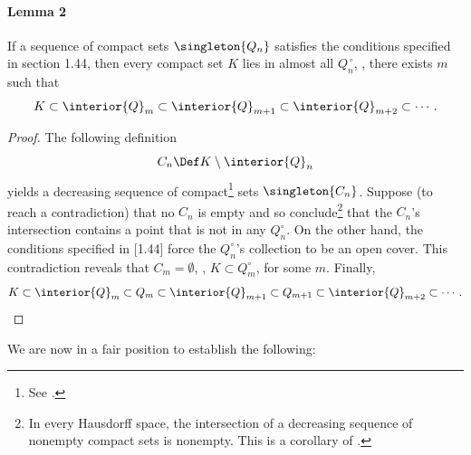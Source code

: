 \paragraph{Lemma 2}\label{1.16 Lemma 2}
If a sequence of compact sets $\singleton{Q_n}$ satisfies the conditions 
specified in section 1.44, then every compact set $K$ lies in almost all 
%
  $Q^{\,\circ}_n$, \ie, 
%
there exists $m$ such that 
%
  \begin{equation}
    K \subset 
    \interior{Q}_m 
      \subset 
    \interior{Q}_{m+1}
      \subset
    \interior{Q}_{m+2}
      \subset
    \cdots.
  \end{equation}
% 
\begin{proof}
The following definition
%
  \begin{equation}
    C_n \Def K \setminus \interior{Q}_n 
  \end{equation}
%
yields a decreasing sequence of compact\footnote{
  See .
} 
sets $\singleton{C_n}$. Suppose (to reach a contradiction) that 
% 
  no $C_n$ is empty 
% 
and so conclude\footnote{
  In every Hausdorff space, the intersection of a decreasing sequence of nonempty compact sets is nonempty. %
  This is a corollary of .
} 
that the $C_n$'s intersection contains a point that is not in any $Q^\circ_n$. 
On the other hand, the conditions specified in [1.44] force the 
% 
  $Q^\circ_n$'s collection  
%
to be an open cover.
% 
This contradiction reveals that 
%
  $C_m = \emptyset$, 
    \ie,  
  $K \subset Q^\circ_m$, 
%  
for some $m$.
%
Finally,  
%
  \begin{equation}
    K\subset 
    \interior{Q}_m
      \subset
    Q_m
      \subset
    \interior{Q}_{m+1}
      \subset
    Q_{m +1}
      \subset
    \interior{Q}_{m+2}
      \subset
    \cdots.
  \end{equation}  
%
\end{proof}
\noindent We are now in a fair position to establish the following:
